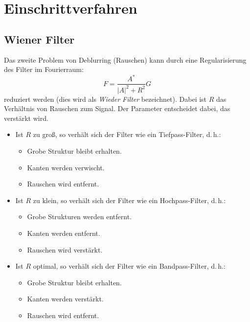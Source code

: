 	\section{Einschrittverfahren}
		\subsection{Wiener Filter}
			Das zweite Problem von Deblurring (Rauschen) kann durch eine Regularisierung des Filter im Fourierraum:
			\begin{equation*}
				F = \frac{A^\ast}{\lvert A \rvert^2 + R^2} G
			\end{equation*}
			reduziert werden (dies wird als \emph{Wieder Filter} bezeichnet). Dabei ist \(R\) das Verhältnis von Rauschen zum Signal. Der Parameter entscheidet dabei, das verstärkt wird.
			\begin{itemize}
				\item Ist \(R\) zu groß, so verhält sich der Filter wie ein Tiefpass-Filter, d.\,h.:
					\begin{itemize}
						\item Grobe Struktur bleibt erhalten.
						\item Kanten werden verwischt.
						\item Rauschen wird entfernt.
					\end{itemize}
				\item Ist \(R\) zu klein, so verhält sich der Filter wie ein Hochpass-Filter, d.\,h.:
					\begin{itemize}
						\item Grobe Strukturen werden entfernt.
						\item Kanten werden entfernt.
						\item Rauschen wird verstärkt.
					\end{itemize}
				\item Ist \(R\) optimal, so verhält sich der Filter wie ein Bandpass-Filter, d.\,h.:
					\begin{itemize}
						\item Grobe Struktur bleibt erhalten.
						\item Kanten werden verstärkt.
						\item Rauschen wird entfernt.
					\end{itemize}
			\end{itemize}
		

